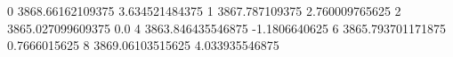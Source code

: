 0 3868.66162109375 3.634521484375
1 3867.787109375 2.760009765625
2 3865.027099609375 0.0
4 3863.846435546875 -1.1806640625
6 3865.793701171875 0.7666015625
8 3869.06103515625 4.033935546875
